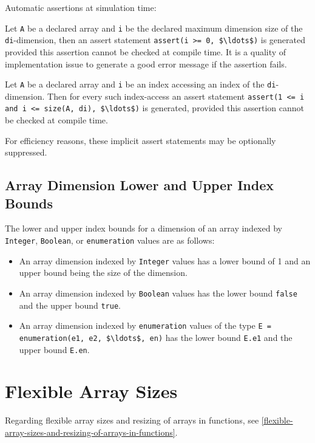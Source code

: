 \begin{nonnormative}
Automatic assertions at simulation time:

Let \lstinline!A! be a declared array and \lstinline!i! be the declared maximum dimension size of the \lstinline!di!-dimension, then an assert statement
\lstinline!assert(i >= 0, $\ldots$)! is generated provided this assertion cannot be checked at compile time.  It is a quality of implementation
issue to generate a good error message if the assertion fails.

Let \lstinline!A! be a declared array and \lstinline!i! be an index accessing an index of the \lstinline!di!-dimension.  Then for every such index-access an assert
statement \lstinline!assert(1 <= i and i <= size(A, di), $\ldots$)! is generated, provided this assertion cannot be checked at compile time.

For efficiency reasons, these implicit assert statements may be optionally suppressed.
\end{nonnormative}

\subsection{Array Dimension Lower and Upper Index Bounds}\label{array-dimension-lower-and-upper-index-bounds}

The lower and upper index bounds for a dimension of an array indexed by \lstinline!Integer!, \lstinline!Boolean!, or \lstinline!enumeration! values are as follows:
\begin{itemize}
\item
  An array dimension indexed by \lstinline!Integer! values has a lower bound of 1 and an upper bound being the size of the dimension.
\item
  An array dimension indexed by \lstinline!Boolean! values has the lower bound \lstinline!false! and the upper bound \lstinline!true!.
\item
  An array dimension indexed by \lstinline!enumeration! values of the type \lstinline!E = enumeration(e1, e2, $\ldots$, en)!
  has the lower bound \lstinline!E.e1! and the upper bound \lstinline!E.en!.
\end{itemize}

\section{Flexible Array Sizes}\label{flexible-array-sizes}

Regarding flexible array sizes and resizing of arrays in functions, see
\cref{flexible-array-sizes-and-resizing-of-arrays-in-functions}.

